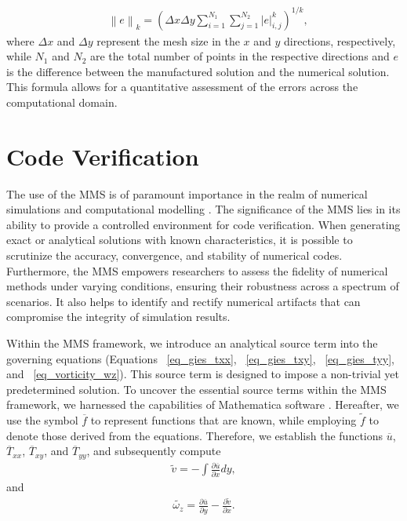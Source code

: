 \documentclass[preprint, 12pt]{elsarticle}
\begin{document}
\begin{align}
    &\left \|e\right \|_{k}=\left(\Delta x \Delta y \sum_{i=1}^{N_{1}}\sum_{j=1}^{N_{2}} \left |e\right |_{i,j}^{k}\right)^{1/k}, \label{norm_k}
\end{align}
where $\Delta x$ and $\Delta y$ represent the mesh size in the $x$ and $y$ directions, respectively, while $N_{1}$ and $N_{2}$ are the total number of points in the respective directions and $e$ is the difference between the manufactured solution and the numerical solution. This formula allows for a quantitative assessment of the errors across the computational domain.

\section{Code Verification}\label{sec_CodeVerification}

The use of the MMS is of paramount importance in the realm of numerical
simulations and computational modelling \cite{Roy2004, Roy2001, Roache2002}.
The significance of the MMS lies in its ability to provide a controlled
environment for code verification. When generating exact or analytical
solutions with known characteristics, it is possible to scrutinize the
accuracy, convergence, and stability of numerical codes. Furthermore, the MMS
empowers researchers to assess the fidelity of numerical methods under varying
conditions, ensuring their robustness across a spectrum of scenarios. It also
helps to identify and rectify numerical artifacts that can compromise the
integrity of simulation results.

Within the MMS framework, we introduce an analytical source term into the
governing equations (Equations ~\eqref{eq_gies_txx}, ~\eqref{eq_gies_txy},
~\eqref{eq_gies_tyy}, and ~\eqref{eq_vorticity_wz}). This source term is
designed to impose a non-trivial yet predetermined solution. To uncover the
essential source terms within the MMS framework, we harnessed the capabilities
of Mathematica software \cite{Mathematica}. {\color{red} Hereafter, we use the symbol
$\overline{f}$ to represent functions that are known, while employing
$\widetilde{f}$ to denote those derived from the equations. Therefore, we
establish the functions $\overline{u}$, $\overline{T}_{xx}$,
$\overline{T}_{xy}$, and $\overline{T}_{yy}$, and subsequently compute}
\begin{gather}
    \widetilde{v} = - \int \frac{\partial \overline{u}}{\partial x}dy,\label{MMS_v_linha}
\end{gather}
and
\begin{gather}
    \widetilde{\omega_z}=\frac{\partial \overline{u}}{\partial y}-\frac{\partial \widetilde{v}}{\partial x}.\label{vortic_corrent_uv_linha}
\end{gather}
\end{document}
